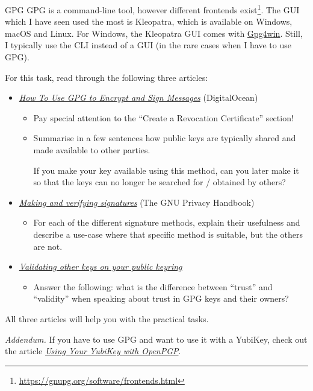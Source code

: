 \documentclass{homework}
\begin{document}
\begin{task}{GPG}
  GPG is a command-line tool, however different frontends exist\footnote{\url{https://gnupg.org/software/frontends.html}}.
  The GUI which I have seen used the most is Kleopatra, which is available on Windows, macOS and Linux.
  For Windows, the Kleopatra GUI comes with \href{https://gpg4win.org/index.html}{Gpg4win}.
  Still, I typically use the CLI instead of a GUI (in the rare cases when I have to use GPG).

  For this task, read through the following three articles:
  \begin{itemize}
    \item \href{https://www.digitalocean.com/community/tutorials/how-to-use-gpg-to-encrypt-and-sign-messages}{\textit{How To Use GPG to Encrypt and Sign Messages}} (DigitalOcean)
    \begin{itemize}
      \item Pay special attention to the \enquote{Create a Revocation Certificate} section!
      \item Summarise in a few sentences how public keys are typically shared and made available to other parties.
      
      If you make your key available using this method, can you later make it so that the keys can no longer be searched for / obtained by others?
    \end{itemize}
    \item \href{https://www.gnupg.org/gph/en/manual/x135.html}{\textit{Making and verifying signatures}} (The GNU Privacy Handbook)
    \begin{itemize}
      \item For each of the different signature methods, explain their usefulness and describe a use-case where that specific method is suitable, but the others are not.
    \end{itemize}

    \item \href{https://www.gnupg.org/gph/en/manual/x334.html}{\textit{Validating other keys on your public keyring}}
    \begin{itemize}
      \item Answer the following: what is the difference between \enquote{trust} and \enquote{validity} when speaking about trust in GPG keys and their owners?
    \end{itemize}
  \end{itemize}

  All three articles will help you with the practical tasks.

  \textit{Addendum.}
  If you have to use GPG and want to use it with a YubiKey, check out the article \href{https://support.yubico.com/hc/en-us/articles/360013790259-Using-Your-YubiKey-with-OpenPGP}{\textit{Using Your YubiKey with OpenPGP}}.
\end{task}
\end{document}
